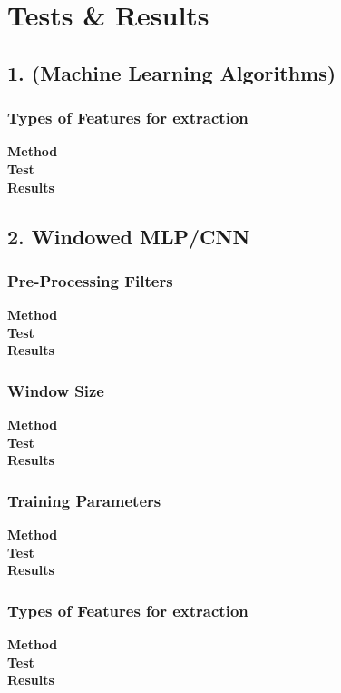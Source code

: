 \documentclass[../main.tex]{subfiles}
\begin{document}
\section{Tests \& Results}

\subsection{1. (Machine Learning Algorithms)}

\subsubsection{Types of Features for extraction}
\textbf{Method}\\
\textbf{Test}\\
\textbf{Results}\\

\subsection{2. Windowed MLP/CNN}

\subsubsection{Pre-Processing Filters}
\textbf{Method}\\
\textbf{Test}\\
\textbf{Results}\\

\subsubsection{Window Size}
\textbf{Method}\\
\textbf{Test}\\
\textbf{Results}\\

\subsubsection{Training Parameters}
\textbf{Method}\\
\textbf{Test}\\
\textbf{Results}\\

\subsubsection{Types of Features for extraction}
\textbf{Method}\\
\textbf{Test}\\
\textbf{Results}\\
\end{document}
